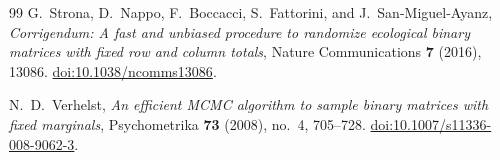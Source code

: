 \begin{thebibliography}{99}
G.~Strona, D.~Nappo, F.~Boccacci, S.~Fattorini, and J.~San-Miguel-Ayanz,
\emph{Corrigendum: A fast and unbiased procedure to randomize ecological binary
matrices with fixed row and column totals},
Nature Communications \textbf{7} (2016), 13086.
\href{https://doi.org/10.1038/ncomms13086}{doi:10.1038/ncomms13086}.

N.~D.~Verhelst,
\emph{An efficient MCMC algorithm to sample binary matrices with fixed marginals},
Psychometrika \textbf{73} (2008), no.~4, 705--728.
\href{https://doi.org/10.1007/s11336-008-9062-3}{doi:10.1007/s11336-008-9062-3}.

\end{thebibliography}
